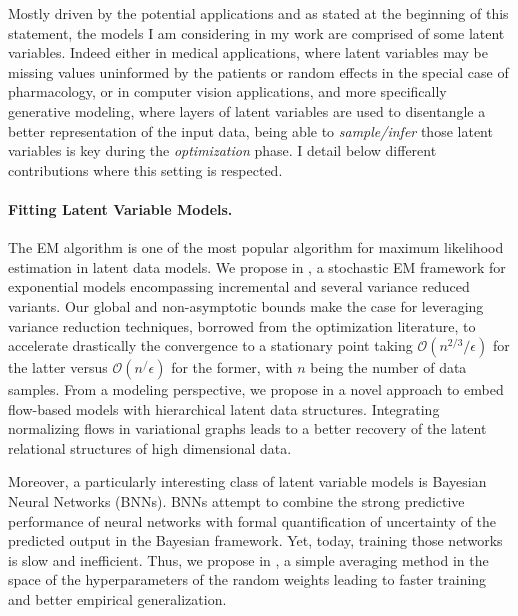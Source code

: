 \documentclass[twoside,11pt]{article}
\begin{document}
\vspace{0.2in}
\textbf{}
\vspace{0.2in}

Mostly driven by the potential applications and as stated at the beginning of this statement, the models I am considering in my work are comprised of some latent variables.
Indeed either in medical applications, where latent variables may be missing values uninformed by the patients or random effects in the special case of pharmacology, or in computer vision applications, and more specifically generative modeling, where layers of latent variables are used to disentangle a better representation of the input data, being able to \emph{sample/infer} those latent variables is key during the \emph{optimization} phase.
I detail below different contributions where this setting is respected.

\vspace{0.08in}
\paragraph{Fitting Latent Variable Models.} 
The EM algorithm is one of the most popular algorithm for maximum likelihood estimation in latent data models.
We propose in \citep{karimi2019global}, a stochastic EM framework for exponential models encompassing incremental and several variance reduced variants.
Our global and non-asymptotic bounds make the case for leveraging variance reduction techniques, borrowed from the optimization literature, to accelerate drastically the convergence to a stationary point taking $\mathcal{O}(n^{2/3}/\epsilon)$ for the latter versus $\mathcal{O}(n^/\epsilon)$ for the former, with $n$ being the number of data samples.
From a modeling perspective, we propose in \citep{ren2020vfg} a novel approach to embed flow-based models with hierarchical latent data structures. 
Integrating normalizing flows in variational graphs leads to a better recovery of the latent relational structures of high dimensional data.

Moreover, a particularly interesting class of latent variable models is Bayesian Neural Networks (BNNs).
BNNs attempt to combine the strong predictive performance of neural networks with formal quantification of uncertainty of the predicted output in the Bayesian framework.
Yet, today, training those networks is slow and inefficient. 
Thus, we propose in \citep{karimi2020hwa}, a simple averaging method in the space of the hyperparameters of the random weights leading to faster training and better empirical generalization.
\end{document}

